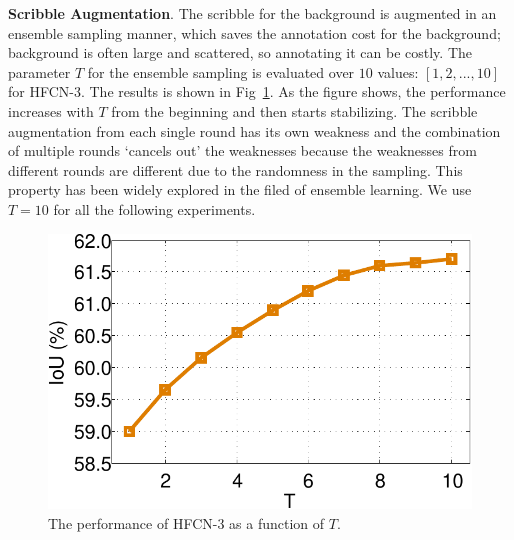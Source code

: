 \textbf{Scribble Augmentation}.  The scribble for the background is
augmented in an ensemble sampling manner, which saves the annotation
cost for the background; background is often large and scattered, so
annotating it can be costly. The parameter $T$ for the ensemble
sampling is evaluated over $10$ values: $[1, 2, ..., 10]$ for HFCN-3.
The results is shown in Fig~\ref{./draw_and_tell/fig:scribble:aug}. As
the figure shows, the performance increases with $T$ from the
beginning and then starts stabilizing.  The scribble augmentation from
each single round has its own weakness and the combination of multiple
rounds `cancels out' the weaknesses because the weaknesses from
different rounds are different due to the randomness in the
sampling. This property has been widely explored in the filed of
ensemble learning. We use $T=10$ for all the following experiments.

\begin{figure}  
\vspace{-4mm}
\includegraphics[width=0.95\linewidth,
height=0.65\linewidth]{./draw_and_tell/fig7/scribble_aug_curve.pdf}
\vspace{-3mm}
  \caption{The performance of HFCN-3 as a function of $T$.}
\label{./draw_and_tell/fig:scribble:aug} %
\end{figure}




